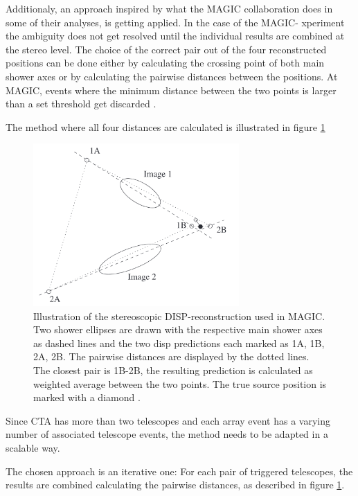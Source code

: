 Additionaly, an approach inspired by 
what the MAGIC collaboration does in some of their analyses,
is getting applied.
In the case of the MAGIC- xperiment the ambiguity does not
get resolved until the individual results are combined
at the stereo level. The choice of the correct
pair out of the four reconstructed positions can be done either
by calculating the crossing point of both main shower axes
or by calculating the pairwise distances between the positions.
At MAGIC, events where the minimum distance between the two points is larger than a set threshold
get discarded \cite{ALEKSIC201676}.

The method where all four distances are calculated is illustrated in figure \ref{fig:disp_magic}

\begin{figure}
    \centering
    \captionsetup{width=0.9\linewidth}
    \includegraphics[width=0.7\textwidth]{images/magic_stereo_disp.png}
    \caption{Illustration of the stereoscopic DISP-reconstruction used in MAGIC.
        Two shower ellipses are drawn with the respective main shower axes as dashed lines
        and the two disp predictions each marked as 1A, 1B, 2A, 2B.
        The pairwise distances are displayed by the dotted lines.
        The closest pair is 1B-2B, the resulting prediction is calculated as 
        weighted average between the two points. The true source position is
        marked with a diamond \cite{ALEKSIC201676}.}
    \label{fig:disp_magic}
\end{figure}


Since CTA has more than two telescopes and each array event has a varying number
of associated telescope events, the method needs to be adapted in a scalable way.

The chosen approach is an iterative one:
For each pair of triggered telescopes, the results are combined
calculating the pairwise distances, as described in figure \ref{fig:disp_magic}. 

